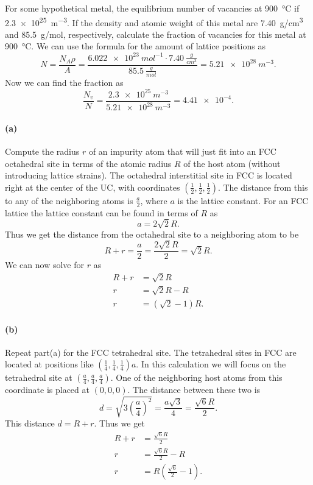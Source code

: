 
For some hypothetical metal, the equilibrium number of vacancies at \qty{900}{\celsius} if \qty{2,3e25}{m^{-3}}. If the density and atomic weight of this metal are \qty{7,40}{g/cm^3} and \qty{85,5}{g/mol}, respectively, calculate the fraction of vacancies for this metal at \qty{900}{\celsius}.
\bigbreak
We can use the formula for the amount of lattice positions as
  \[ 
  N = \frac{N_A \rho}{A} = \frac{\qty{6,022e23}{mol^{-1}} \cdot \qty{7,40}{\frac{g}{cm^3}}}{\qty{85,5}{\frac{g}{mol}}} = \qty{5,21e28}{m^{-3}}
  .\]
  Now we can find the fraction as
  \[ 
    \frac{N_v}{N} = \frac{\qty{2,3e25}{m^{-3}}}{\qty{5,21e28}{m^{-3}}} = \num{4,41e-4}
  .\]

\paragraph{(a)} Compute the radius $r$ of an impurity atom that will just fit into an FCC octahedral site in terms of the atomic radius $R$ of the host atom (without introducing lattice strains).
\bigbreak
The octahedral interstitial site in FCC is located right at the center of the UC, with coordinates $\left( \frac{1}{2}, \frac{1}{2}, \frac{1}{2} \right)$. The distance from this to any of the neighboring atoms is $\frac{a}{2}$, where $a$ is the lattice constant. For an FCC lattice the lattice constant can be found in terms of $R$ as
\[ 
a = 2 \sqrt{2}R
.\]
Thus we get the distance from the octahedral site to a neighboring atom to be
\[ 
R + r = \frac{a}{2} = \frac{2 \sqrt{2}R}{2} = \sqrt{2}R
.\]
We can now solve for $r$ as
\begin{align*}
  R + r &= \sqrt{2}R \\
  r &= \sqrt{2}R - R \\
  r &= \left( \sqrt{2} - 1 \right)R
.\end{align*}

\paragraph{(b)} Repeat part(a) for the FCC tetrahedral site.
\bigbreak
The tetrahedral sites in FCC are located at positions like $\left( \frac{1}{4}, \frac{1}{4}, \frac{1}{4} \right) a$. In this calculation we will focus on the tetrahedral site at $\left( \frac{a}{4}, \frac{a}{4}, \frac{a}{4} \right)$. One of the neighboring host atoms from this coordinate is placed at $(0, 0, 0)$. The distance between these two is
\[ 
d = \sqrt{3\left( \frac{a}{4} \right)^2} = \frac{a \sqrt{3}}{4} = \frac{\sqrt{6}R}{2}
.\]
This distance $d = R + r$. Thus we get
\begin{align*}
  R + r &= \frac{\sqrt{6}R}{2} \\
  r &= \frac{\sqrt{6} R}{2} - R \\
  r &= R \left( \frac{\sqrt{6}}{2} - 1 \right)
.\end{align*}



